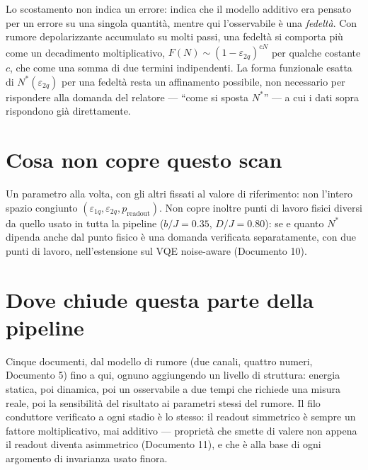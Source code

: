 \documentclass[11pt,a4paper]{article}
\begin{document}
Lo scostamento non indica un errore: indica che il modello additivo era
pensato per un errore su una singola quantità, mentre qui l'osservabile è una
\emph{fedeltà}. Con rumore depolarizzante accumulato su molti passi, una
fedeltà si comporta più come un decadimento moltiplicativo,
$F(N)\sim(1-\varepsilon_{2q})^{cN}$ per qualche costante $c$, che come una
somma di due termini indipendenti. La forma funzionale esatta di
$N^*(\varepsilon_{2q})$ per una fedeltà resta un affinamento possibile, non
necessario per rispondere alla domanda del relatore --- ``come si sposta
$N^*$'' --- a cui i dati sopra rispondono già direttamente.

\section{Cosa non copre questo scan}

Un parametro alla volta, con gli altri fissati al valore di riferimento: non
l'intero spazio congiunto $(\varepsilon_{1q},\varepsilon_{2q},p_\text{readout})$.
Non copre inoltre punti di lavoro fisici diversi da quello usato in tutta la
pipeline ($b/J=0.35$, $D/J=0.80$): se e quanto $N^*$ dipenda anche dal punto
fisico è una domanda verificata separatamente, con due punti di lavoro,
nell'estensione sul VQE noise-aware (Documento 10).

\section{Dove chiude questa parte della pipeline}

Cinque documenti, dal modello di rumore (due canali, quattro numeri, Documento
5) fino a qui, ognuno aggiungendo un livello di struttura: energia statica,
poi dinamica, poi un osservabile a due tempi che richiede una misura reale,
poi la sensibilità del risultato ai parametri stessi del rumore. Il filo
conduttore verificato a ogni stadio è lo stesso: il readout simmetrico è
sempre un fattore moltiplicativo, mai additivo --- proprietà che smette di
valere non appena il readout diventa asimmetrico (Documento 11), e che è alla
base di ogni argomento di invarianza usato finora.

\end{document}
